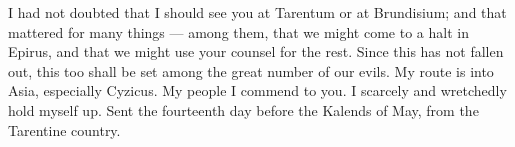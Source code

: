 

I had not doubted that I should see you at Tarentum or at Brundisium; and that mattered for many things --- among them, that we might come to a halt in Epirus, and that we might use your counsel for the rest. Since this has not fallen out, this too shall be set among the great number of our evils. My route is into Asia, especially Cyzicus. My people I commend to you. I scarcely and wretchedly hold myself up. Sent the fourteenth day before the Kalends of May, from the Tarentine country.
